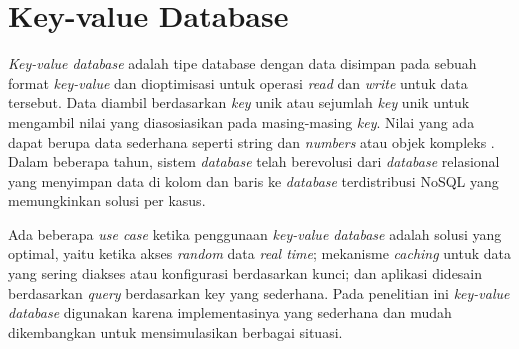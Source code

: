 \section{Key-value Database}

\textit{Key-value database} adalah tipe database dengan data disimpan pada sebuah format \textit{key-value} dan dioptimisasi untuk operasi \textit{read} dan \textit{write} untuk data tersebut. Data diambil berdasarkan \textit{key} unik atau sejumlah \textit{key} unik untuk mengambil nilai yang diasosiasikan pada masing-masing \textit{key}. Nilai yang ada dapat berupa data sederhana seperti string dan \textit{numbers} atau objek kompleks \parencite{mongo2024keyvalue}. Dalam beberapa tahun, sistem \textit{database} telah berevolusi dari \textit{database} relasional yang menyimpan data di kolom dan baris ke \textit{database} terdistribusi NoSQL yang memungkinkan solusi per kasus.

Ada beberapa \textit{use case} ketika penggunaan \textit{key-value database} adalah solusi yang optimal, yaitu ketika akses \textit{random} data \textit{real time}; mekanisme \textit{caching} untuk data yang sering diakses atau konfigurasi berdasarkan kunci; dan aplikasi didesain berdasarkan \textit{query} berdasarkan key yang sederhana. Pada penelitian ini \textit{key-value database} digunakan karena implementasinya yang sederhana dan mudah dikembangkan untuk mensimulasikan berbagai situasi.
